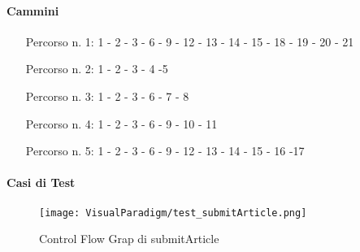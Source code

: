 \paragraph{Cammini}
\begin{itemize}
\item[Percorso n. 1: ]  1 - 2 - 3 - 6 - 9 - 12 - 13 - 14 - 15 - 18 - 19 - 20 - 21
\item[Percorso n. 2: ] 1 - 2 - 3 - 4 -5
\item[Percorso n. 3: ] 1 - 2 - 3 - 6 - 7 - 8
\item[Percorso n. 4: ] 1 - 2 - 3 - 6 - 9 - 10 - 11  
\item[Percorso n. 5: ] 1 - 2 - 3 - 6 - 9 - 12 - 13 - 14 - 15 - 16 -17
\end{itemize}
\paragraph{Casi di Test}
\begin{figure}[ht]
  \centering
  \texttt{[image: VisualParadigm/test\_submitArticle.png]}
  \caption{Control Flow Grap di submitArticle}
  \label{fig:cfg_submitArticle }
\end{figure}
